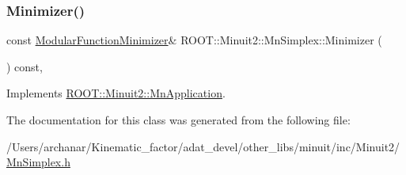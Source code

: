 \subsubsection{\texorpdfstring{Minimizer()}{Minimizer()}\hspace{0.1cm}{\footnotesize\ttfamily [2/2]}}
{\footnotesize\ttfamily const \mbox{\hyperlink{classROOT_1_1Minuit2_1_1ModularFunctionMinimizer}{Modular\+Function\+Minimizer}}\& R\+O\+O\+T\+::\+Minuit2\+::\+Mn\+Simplex\+::\+Minimizer (\begin{DoxyParamCaption}{ }\end{DoxyParamCaption}) const\hspace{0.3cm}{\ttfamily [inline]}, {\ttfamily [virtual]}}



Implements \mbox{\hyperlink{classROOT_1_1Minuit2_1_1MnApplication_a5a8e1e2658b731b5f4023dd1b1594223}{R\+O\+O\+T\+::\+Minuit2\+::\+Mn\+Application}}.



The documentation for this class was generated from the following file\+:\begin{DoxyCompactItemize}
\item 
/\+Users/archanar/\+Kinematic\+\_\+factor/adat\+\_\+devel/other\+\_\+libs/minuit/inc/\+Minuit2/\mbox{\hyperlink{other__libs_2minuit_2inc_2Minuit2_2MnSimplex_8h}{Mn\+Simplex.\+h}}\end{DoxyCompactItemize}
